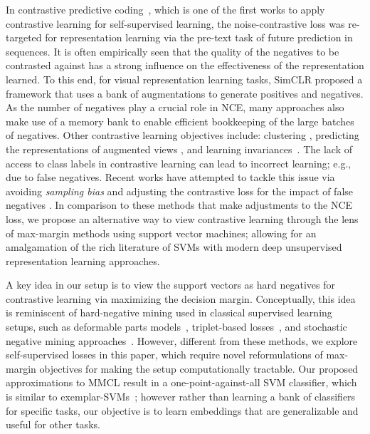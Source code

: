 \documentclass[letterpaper]{article} \usepackage{aaai22}  \usepackage{times}  \usepackage{helvet}  \usepackage{courier}  \usepackage[hyphens]{url}  \usepackage{graphicx} \urlstyle{rm} \def\UrlFont{\rm}  \usepackage{natbib}  \usepackage{caption} \DeclareCaptionStyle{ruled}{labelfont=normalfont,labelsep=colon,strut=off} \frenchspacing  \setlength{\pdfpagewidth}{8.5in}  \setlength{\pdfpageheight}{11in}
\begin{document}
 In contrastive predictive coding~\cite{oord2018representation}, which is one of the first works to apply contrastive learning for self-supervised learning, the noise-contrastive loss was re-targeted for representation learning via the pre-text task of future prediction in sequences. It is often empirically seen that the quality of the negatives to be contrasted against has a strong influence on the effectiveness of the representation learned. To this end, for visual representation learning tasks, SimCLR \cite{chen2020simple,chen2020big} proposed a framework that uses a bank of augmentations to generate positives and negatives. As the number of negatives play a crucial role in NCE, many approaches also make use of a memory bank \cite{chen2020improved,he2020momentum,misra2020self,zhuang2019local} to enable efficient bookkeeping of the large batches of negatives. Other contrastive learning objectives include: clustering \cite{caron2018deep,caron2020unsupervised,PCL},  predicting the representations of augmented views \cite{grill2020bootstrap}, and learning invariances~\cite{tian2019contrastive,Xiao2020WhatSN}. The lack of access to class labels in contrastive learning can lead to incorrect learning; e.g., due to false negatives. Recent works have attempted to tackle this issue via avoiding \emph{sampling bias} \cite{chuang2020debiased} and adjusting the contrastive loss for the impact of false negatives \cite{robinson2021contrastive,huynh2020boosting,kalantidis2020hard,Iscen2018MiningOM}. In comparison to these methods that make adjustments to the NCE loss, we propose an alternative way to view contrastive learning through the lens of max-margin methods using support vector machines; allowing for an amalgamation of the rich literature of SVMs with modern deep unsupervised representation learning approaches.

A key idea in our setup is to view the support vectors as hard negatives for contrastive learning via maximizing the decision margin. Conceptually, this idea is reminiscent of hard-negative mining used in classical supervised learning setups, such as deformable parts models~\cite{felzenszwalb2009object}, triplet-based losses~\cite{schroff2015facenet}, and stochastic negative mining approaches~\cite{reddi2019stochastic}. However, different from these methods, we explore self-supervised losses in this paper, which require novel reformulations of max-margin objectives for making the setup computationally tractable. Our proposed approximations to MMCL result in a one-point-against-all SVM classifier, which is similar to exemplar-SVMs~\cite{malisiewicz2011ensemble}; however rather than learning a bank of classifiers for specific tasks, our objective is to learn embeddings that are generalizable and useful for other tasks.
\end{document}
